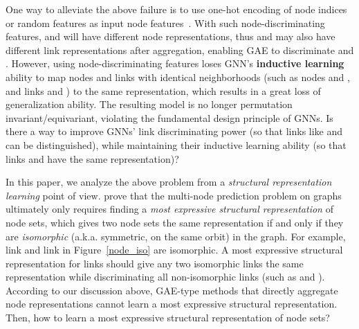 \documentclass{article}
\begin{document}
One way to alleviate the above failure is to use one-hot encoding of node indices or random features as input node features~\citep{loukas2019graph,sato2020random}. With such node-discriminating features,  and  will have different node representations, thus  and  may also have different link representations after aggregation, enabling GAE to discriminate  and . However, using node-discriminating features loses GNN's \textbf{inductive learning} ability to map nodes and links with identical neighborhoods (such as nodes  and , and links  and ) to the same representation, which results in a great loss of generalization ability. The resulting model is no longer permutation invariant/equivariant, violating the fundamental design principle of GNNs. Is there a way to improve GNNs' link discriminating power (so that links like  and  can be distinguished), while maintaining their inductive learning ability (so that links  and  have the same representation)?






In this paper, we analyze the above problem from a \textit{structural representation learning} point of view. \citet{Srinivasan2020On} prove that the multi-node prediction problem on graphs ultimately only requires finding a \textit{most expressive structural representation} of node sets, which gives two node sets the same representation if and only if they are \textit{isomorphic} (a.k.a. symmetric, on the same orbit) in the graph. For example, link  and link  in Figure~\ref{node_iso} are isomorphic. A most expressive structural representation for links should give any two isomorphic links the same representation while discriminating all non-isomorphic links (such as  and ). According to our discussion above, GAE-type methods that directly aggregate node representations cannot learn a most expressive structural representation. 
Then, how to learn a most expressive structural representation of node sets?
\end{document}
